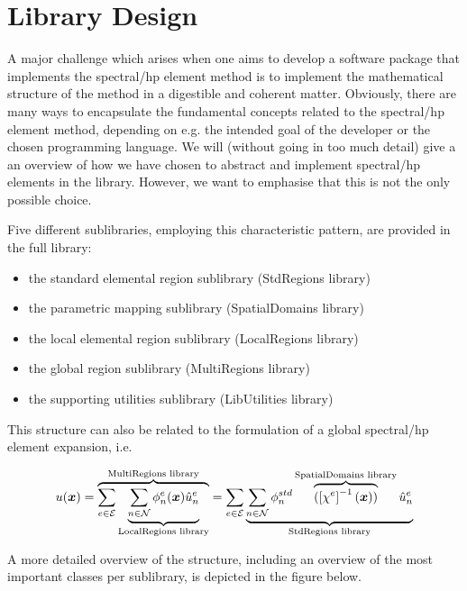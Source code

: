\chapter{Library Design}

A major challenge which arises when one aims to develop a software package that
implements the spectral/hp element method is to implement the mathematical
structure of the method in a digestible and coherent matter. Obviously, there
are many ways to encapsulate the fundamental concepts related to the spectral/hp
element method, depending on e.g. the intended goal of the developer or the
chosen programming language. We will (without going in too much detail) give a
an overview of how we have chosen to abstract and implement spectral/hp elements
in the \nekpp library. However, we want to emphasise that this is not the
only possible choice.

Five different sublibraries, employing this characteristic pattern, are provided
in the full \nekpp library:

\begin{itemize}
\item the standard elemental region sublibrary (StdRegions library)
\item the parametric mapping sublibrary (SpatialDomains library)
\item the local elemental region sublibrary (LocalRegions library)
\item the global region sublibrary (MultiRegions library)
\item the supporting utilities sublibrary (LibUtilities library)
\end{itemize}

This structure can also be related to the formulation of a global spectral/hp
element expansion, i.e.

\begin{align*}
  u(\boldsymbol{x})=\overbrace{\sum_{e\in\mathcal{E}}\underbrace{\sum_{n\in\mathcal{N}}\phi^e_n(\boldsymbol{x})\hat{u}^e_n}_{\mbox{\scriptsize{LocalRegions
  library}}}}^{\mbox{\scriptsize{MultiRegions
  library}}}=\sum_{e\in\mathcal{E}}\underbrace{\sum_{n\in\mathcal{N}}\phi^{std}_n\overbrace{(\left[\chi^e\right]^{-1}(\boldsymbol{x}))}^{\mbox{\scriptsize{SpatialDomains
  library}}}\hat{u}^e_n}_{\mbox{\scriptsize{StdRegions library}}}
\end{align*}

A more detailed overview of the \nekpp structure, including an overview of
the most important classes per sublibrary, is depicted in the figure below.

